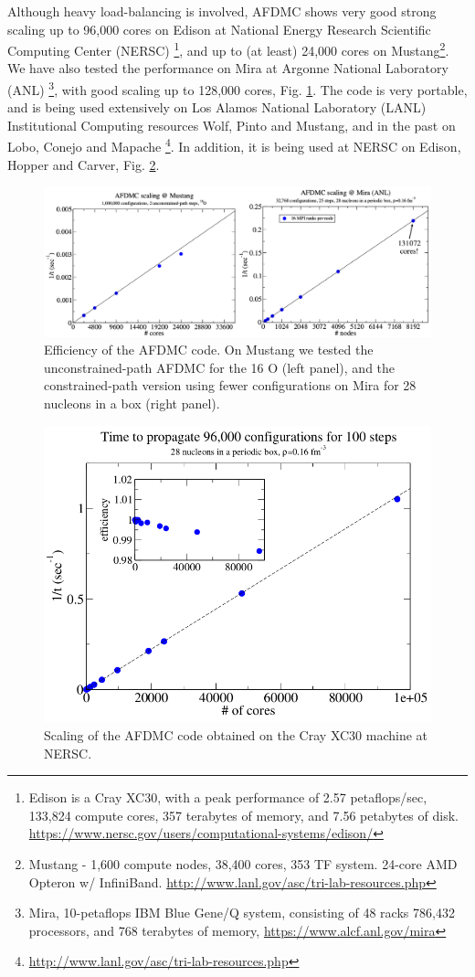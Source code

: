 \documentclass[12pt,letterpaper]{article}
\begin{document}
Although heavy load-balancing is
involved, AFDMC shows very good strong scaling up to 96,000 cores on Edison 
at National Energy Research Scientific Computing Center (NERSC)
\footnote{Edison is a Cray XC30, with a peak performance of 2.57 
petaflops/sec, 133,824 compute cores, 357 terabytes of memory, and 7.56 
petabytes of disk.
\url{https://www.nersc.gov/users/computational-systems/edison/}
}, and
up to (at least) 24,000 cores on Mustang\footnote{
Mustang - 1,600 compute nodes, 38,400 cores, 353 TF system. 24-core AMD 
Opteron w/ InfiniBand. \url{http://www.lanl.gov/asc/tri-lab-resources.php}
}. 
We have also tested the performance on Mira at Argonne National Laboratory 
(ANL)
\footnote{
Mira, 10-petaflops IBM Blue Gene/Q system, consisting of 48 racks 786,432 
processors, and 768 terabytes of memory,
\url{https://www.alcf.anl.gov/mira}
}, with good scaling up to 128,000 cores, Fig. \ref{fig:mustang}. The code 
is very portable, and is being used extensively on Los Alamos National 
Laboratory (LANL) Institutional 
Computing resources
Wolf, Pinto and Mustang, and in the past on Lobo, Conejo and Mapache
\footnote{\url{http://www.lanl.gov/asc/tri-lab-resources.php}}.
In addition, it is being used at NERSC on Edison, Hopper and Carver, Fig. \ref{fig:cray}.

\begin{figure}[!htb]
\centering
\includegraphics[width=\linewidth]{mustang.png}
\caption{Efficiency of the AFDMC code. On Mustang we tested the unconstrained-path AFDMC
for the 16 O (left panel), and the constrained-path version using fewer configurations on Mira for 28
nucleons in a box (right panel).}
\label{fig:mustang}
\end{figure}	

\begin{figure}[!htb]
\centering
\includegraphics[width=0.5\linewidth]{cray.png}
\caption{Scaling of the AFDMC code obtained on the Cray XC30 machine at NERSC.}
\label{fig:cray}
\end{figure}	
\end{document}
